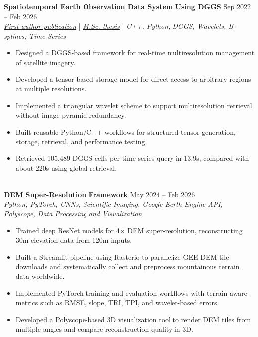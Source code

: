 \documentclass[a4paper,10pt]{article}
\begin{document}
\noindent
\textbf{Spatiotemporal Earth Observation Data System Using DGGS} \hfill Sep 2022 -- Feb 2026 \\
\textit{\href{https://doi.org/10.3390/rs17040570}{First-author publication}} | \textit{\href{https://ucalgary.scholaris.ca/items/114b394b-e516-4732-bd3a-45dd6160d480}{M.Sc. thesis}} | \textit{C++, Python, DGGS, Wavelets, B-splines, Time-Series}
\begin{itemize}[leftmargin=0.25in]
    \item Designed a DGGS-based framework for real-time multiresolution management of satellite imagery.
    \item Developed a tensor-based storage model for direct access to arbitrary regions at multiple resolutions.
    \item Implemented a triangular wavelet scheme to support multiresolution retrieval without image-pyramid redundancy.
    \item Built reusable Python/C++ workflows for structured tensor generation, storage, retrieval, and performance testing.
    \item Retrieved 105,489 DGGS cells per time-series query in 13.9s, compared with about 220s using global retrieval.
\end{itemize}

\noindent \\
\textbf{DEM Super-Resolution Framework} \hfill May 2024 -- Feb 2026 \\
\textit{Python, PyTorch, CNNs, Scientific Imaging, Google Earth Engine API, Polyscope, Data Processing and Visualization}
\begin{itemize}[leftmargin=0.25in]
    \item Trained deep ResNet models for 4$\times$ DEM super-resolution, reconstructing 30m elevation data from 120m inputs.
    \item Built a Streamlit pipeline using Rasterio to parallelize GEE DEM tile downloads and systematically collect and preprocess mountainous terrain data worldwide.
    \item Implemented PyTorch training and evaluation workflows with terrain-aware metrics such as RMSE, slope, TRI, TPI, and wavelet-based errors.
    \item Developed a Polyscope-based 3D visualization tool to render DEM tiles from multiple angles and compare reconstruction quality in 3D.
\end{itemize}
\end{document}
